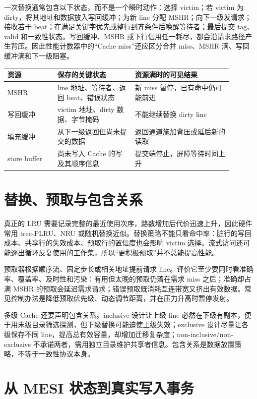 一次替换通常包含以下状态，而不是一个瞬时动作：选择 victim；若 victim 为 dirty，将其地址和数据放入写回缓冲；为新 line 分配 MSHR；向下一级发请求；接收若干 beat；在满足关键字优先或整行到齐条件后唤醒等待者；最后提交 tag、valid 和一致性状态。写回缓冲、MSHR 或下行信用任一耗尽，都会沿请求路径产生背压。因此性能计数器中的“Cache miss”还应区分合并 miss、MSHR 满、写回缓冲满和下一级阻塞。

\begin{longtable}{L{0.2\linewidth}L{0.31\linewidth}L{0.39\linewidth}}
\toprule
资源 & 保存的关键状态 & 资源满时的可见结果 \\
\midrule
MSHR & line 地址、等待者、返回 beat、错误状态 & 新 miss 暂停，已有命中仍可能前进 \\
写回缓冲 & victim 地址、dirty 数据、字节掩码 & 不能继续替换 dirty line \\
填充缓冲 & 从下一级返回但尚未提交的数据 & 返回通道施加背压或延后新的读取 \\
store buffer & 尚未写入 Cache 的写及其顺序信息 & 提交端停止，屏障等待时间上升 \\
\bottomrule
\end{longtable}

\section{替换、预取与包含关系}

真正的 LRU 需要记录完整的最近使用次序，路数增加后代价迅速上升，因此硬件常用 tree-PLRU、NRU 或随机替换近似。替换策略不能只看命中率：脏行的写回成本、共享行的失效成本、预取行的置信度也会影响 victim 选择。流式访问还可能逐出循环反复使用的工作集，所以“更积极预取”并不总能提高性能。

预取器根据顺序流、固定步长或相关地址提前请求 line。评价它至少要同时看准确率、覆盖率、及时性和污染：有用但太晚的预取仍落在需求 miss 之后；准确却占满 MSHR 的预取会延迟需求请求；错误预取既消耗互连带宽又挤出有效数据。常见控制办法是降低预取优先级、动态调节距离，并在压力升高时暂停发射。

多级 Cache 还要声明包含关系。inclusive 设计让上级 line 必然在下级有副本，便于用末级目录筛选探测，但下级替换可能迫使上级失效；exclusive 设计尽量让各级保存不同 line，提高总有效容量，却增加迁移复杂度；non-inclusive/non-exclusive 不承诺两者，需用独立目录维护共享者信息。包含关系是数据放置策略，不等于一致性协议本身。

\section{从 MESI 状态到真实写入事务}

